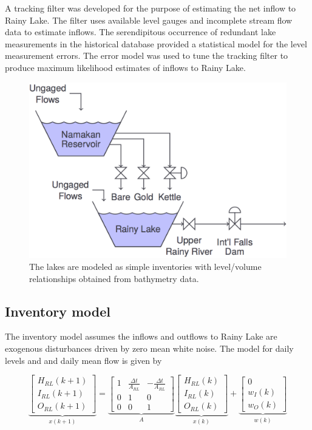 \documentclass[preprint,times]{elsarticle}
\begin{document}
A tracking filter was developed for the purpose of estimating the net inflow to Rainy Lake. The filter uses available level gauges and incomplete stream flow data to estimate inflows. The serendipitous occurrence of redundant lake measurements in the historical database provided a statistical model for the level measurement errors. The error model was used to tune the tracking filter to produce maximum likelihood estimates of inflows to Rainy Lake. 

\begin{figure}
\includegraphics[width=\linewidth]{FlowDiagram}
\caption{The lakes are modeled as simple inventories with level/volume relationships obtained from bathymetry data.}\label{figure:5}
\end{figure}

\subsection{Inventory model}

The inventory model assumes the inflows and outflows to Rainy Lake are exogenous disturbances driven by zero mean white noise. The model for daily levels and and daily mean flow is given by

{\tiny
$$\underbrace{\left[\begin{array}{c} H_{RL}(k+1) \\ I_{RL}(k+1) \\ O_{RL}(k+1) \end{array}\right]}_{x(k+1)} = \underbrace{\left[ \begin{array}{ccc} 1 & \frac{\Delta t}{A_{RL}} & -\frac{\Delta t}{A_{RL}} \\0 & 1 & 0\\0 & 0 &  1\end{array}\right]}_{A} \underbrace{\left[\begin{array}{c} H_{RL}(k) \\ I_{RL}(k) \\ O_{RL}(k) \end{array}\right]}_{x(k)} + \underbrace{\left[ \begin{array}{c} 0 \\ w_{I}(k) \\ w_{O}(k)\end{array}\right]}_{w(k)}$$
}
\end{document}
